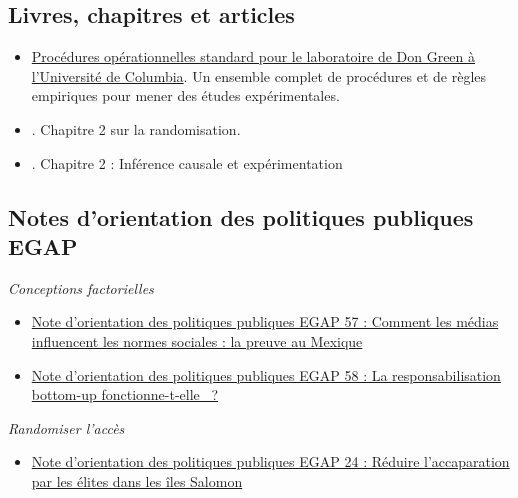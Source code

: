 \documentclass[
  12pt,
]{book}
\providecommand{\tightlist}{%
  \setlength{\itemsep}{0pt}\setlength{\parskip}{0pt}}
\begin{document}
\hypertarget{livres-chapitres-et-articles-1}{%
\subsection{Livres, chapitres et articles}\label{livres-chapitres-et-articles-1}}

\begin{itemize}
\item
  \href{https://github.com/acoppock/Green-Lab-SOP}{Procédures opérationnelles standard pour le laboratoire de Don Green à l'Université de Columbia}. Un ensemble complet de procédures et de règles empiriques pour mener des études expérimentales.
\item
  \autocite{glennerster_running_2013}. Chapitre 2 sur la randomisation.
\item
  \autocite{gerber_field_2012}. Chapitre 2 : Inférence causale et expérimentation
\end{itemize}

\hypertarget{notes-dorientation-des-politiques-publiques-egap-1}{%
\subsection{Notes d'orientation des politiques publiques EGAP}\label{notes-dorientation-des-politiques-publiques-egap-1}}

\emph{Conceptions factorielles}

\begin{itemize}
\item
  \href{https://egap.org/resource/how-media-influence-social-norms-evidence-from-mexico/}{Note d'orientation des politiques publiques EGAP 57 : Comment les médias influencent les normes sociales : la preuve au Mexique}
\item
  \href{https://egap.org/resource/does-bottom-up-accountability-work-evidence-from-uganda/}{Note d'orientation des politiques publiques EGAP 58 : La responsabilisation bottom-up fonctionne-t-elle~ ?}
\end{itemize}

\emph{Randomiser l'accès}

\begin{itemize}
\tightlist
\item
  \href{https://egap.org/resource/brief-24-reducing-elite-capture-in-the-solomon-islands/}{Note d'orientation des politiques publiques EGAP 24 : Réduire l'accaparation par les élites dans les îles Salomon}
\end{itemize}
\end{document}

